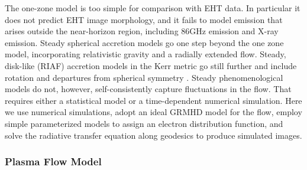 The one-zone model is too simple for comparison with EHT data.  In particular it does not predict EHT image morphology, and it fails to model emission that arises outside the near-horizon region, including 86GHz emission and X-ray emission. 
Steady spherical accretion models \citep[e.g.,][]{2019ApJ...885L..33N, 2022ApJ...925..119B} go one  step beyond the one zone model, incorporating relativistic gravity and a radially extended flow.
Steady, disk-like (RIAF) accretion models in the Kerr metric go still further and include rotation and departures from spherical symmetry \citep[e.g.,][]{2009ApJ...697...45B, 2009ApJ...706..960H,2018ApJ...863..148P}.
Steady phenomenological models do not, however, self-consistently capture fluctuations in the flow.
That requires either a statistical model \citep{2021ApJ...906...39L} or a time-dependent numerical simulation.
Here we
use numerical simulations,
adopt an ideal GRMHD model for the flow,
employ simple parameterized models to assign an electron distribution function, and
solve the radiative transfer equation along geodesics to produce simulated images.

\subsubsection{Plasma Flow Model}

